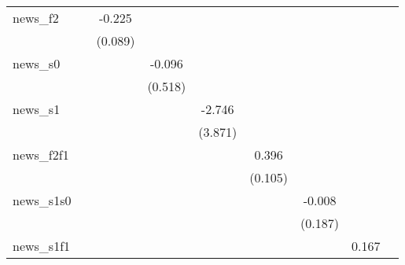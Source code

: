 {\begin{tabular}{l*{8}{c}}
\addlinespace
news\_f2     &                     &      -0.225\sym{**} &                     &                     &                     &                     &                     &                     \\
            &                     &     (0.089)         &                     &                     &                     &                     &                     &                     \\
\addlinespace
news\_s0     &                     &                     &      -0.096         &                     &                     &                     &                     &                     \\
            &                     &                     &     (0.518)         &                     &                     &                     &                     &                     \\
\addlinespace
news\_s1     &                     &                     &                     &      -2.746         &                     &                     &                     &                     \\
            &                     &                     &                     &     (3.871)         &                     &                     &                     &                     \\
\addlinespace
news\_f2f1   &                     &                     &                     &                     &       0.396\sym{***}&                     &                     &                     \\
            &                     &                     &                     &                     &     (0.105)         &                     &                     &                     \\
\addlinespace
news\_s1s0   &                     &                     &                     &                     &                     &      -0.008         &                     &                     \\
            &                     &                     &                     &                     &                     &     (0.187)         &                     &                     \\
\addlinespace
news\_s1f1   &                     &                     &                     &                     &                     &                     &       0.167         &                     \\

\end{tabular}}
